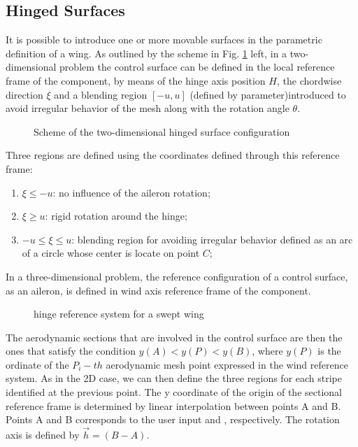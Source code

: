 \subsection{Hinged Surfaces}
\label{sec:Hinge_surfaces}
It is possible to introduce one or more movable surfaces in the parametric definition of a wing.
As outlined by the scheme in Fig. \ref{fig:hinge} left, in a two-dimensional problem the control 
surface can be defined in the local reference frame of the component, by means of the hinge axis 
position $H$, the chordwise direction $\xi$ and a blending region $[-u, u]$ 
(defined by  parameter)introduced to avoid irregular behavior of the 
mesh along with the rotation angle $\theta$.
\begin{figure}[htbp]
\vspace{-3cm}
\centering
    \def\svgwidth{\columnwidth}
    
    \caption{Scheme of the two-dimensional hinged surface configuration}
    \label{fig:hinge}
\end{figure}
Three regions are defined using the coordinates defined through this reference frame:
\begin{enumerate}
  \item $\xi \leq -u$: no influence of the aileron rotation;
  \item $\xi \geq  u$: rigid rotation around the hinge;
  \item $-u \le \xi \le  u$: blending region for avoiding irregular behavior defined as an 
  arc of a circle whose center is locate on point $C$;
\end{enumerate}
In a three-dimensional problem, the reference configuration of a control surface, 
as an aileron, is defined in wind axis reference frame of the component.
\begin{figure}[htbp]
    \centering
    \def\svgwidth{\columnwidth}
    
    \caption{hinge reference system for a swept wing}
    \label{fig:hingeref}
\end{figure}

The aerodynamic sections that are involved in the control surface are then the 
ones that satisfy the condition $y(A) < y(P) < y(B)$, where $y(P)$ is the 
ordinate of the $P_i-th$ aerodynamic mesh point expressed in the wind reference system. 
As in the 2D case, we can then define the three regions for each stripe identified 
at the previous point. The y coordinate of the origin of the sectional reference 
frame is determined by linear interpolation between points A and B. 
Points A and B corresponds to the user input  and , respectively. 
The rotation axis is defined by $\Vec{h} = (B - A)$.

